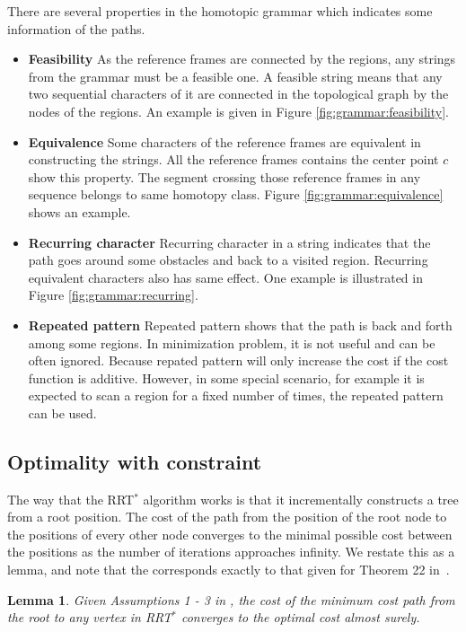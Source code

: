 \documentclass[letterpaper, 10 pt, conference]{ieeeconf}
\newtheorem{lem}{Lemma}
\begin{document}
There are several properties in the homotopic grammar which indicates some information of the paths.
\begin{itemize}
\item \textbf{Feasibility}
As the reference frames are connected by the regions, any strings from the grammar must be a feasible one.
A feasible string means that any two sequential characters of it are connected in the topological graph by the nodes of the regions.
An example is given in Figure \ref{fig:grammar:feasibility}.

\item \textbf{Equivalence}
Some characters of the reference frames are equivalent in constructing the strings.
All the reference frames contains the center point $ c $ show this property.
The segment crossing those reference frames in any sequence belongs to same homotopy class.
Figure \ref{fig:grammar:equivalence} shows an example.

\item \textbf{Recurring character}
Recurring character in a string indicates that the path goes around some obstacles and back to a visited region.
Recurring equivalent characters also has same effect.
One example is illustrated in Figure \ref{fig:grammar:recurring}.

\item \textbf{Repeated pattern}
Repeated pattern shows that the path is back and forth among some regions.
In minimization problem, it is not useful and can be often ignored.
Because repated pattern will only increase the cost if the cost function is additive.
However, in some special scenario, for example it is expected to scan a region for a fixed number of times, the repeated pattern can be used.

\end{itemize}

\subsection{Optimality with constraint}
\label{sec:optimality_constraint}

The way that the RRT$^{*}$ algorithm works is that it incrementally constructs a tree from a root position.  
The cost of the path from the position of the root node to the positions of every other node converges to the minimal possible cost between the positions as the number of iterations approaches infinity.  
We restate this as a lemma, and note that the corresponds exactly to that given for Theorem 22 in~\cite{Karaman-RSS-10}.
\begin{lem}
\label{lem:tree_vex:conv}
Given Assumptions 1 - 3 in \cite{Karaman-RSS-10},
the cost of the minimum cost path from the root to any vertex in RRT$^{*}$ converges to the optimal cost almost surely.
\end{lem}
\end{document}
